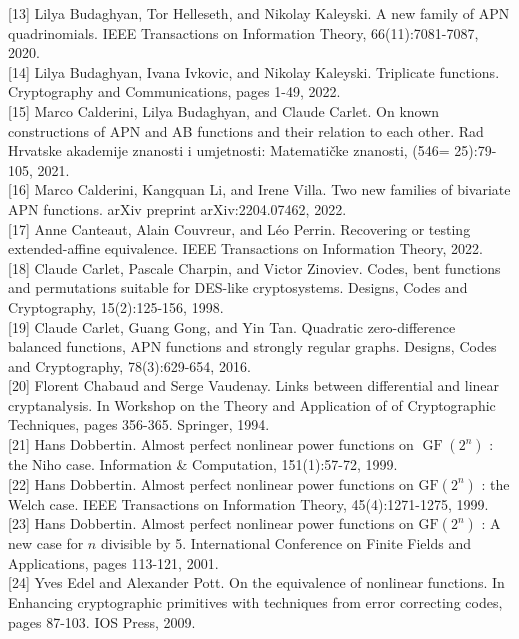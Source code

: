 \documentclass[10pt]{article}
\begin{document}
[13] Lilya Budaghyan, Tor Helleseth, and Nikolay Kaleyski. A new family of APN quadrinomials. IEEE Transactions on Information Theory, 66(11):7081-7087, 2020.\\[0pt]
[14] Lilya Budaghyan, Ivana Ivkovic, and Nikolay Kaleyski. Triplicate functions. Cryptography and Communications, pages 1-49, 2022.\\[0pt]
[15] Marco Calderini, Lilya Budaghyan, and Claude Carlet. On known constructions of APN and AB functions and their relation to each other. Rad Hrvatske akademije znanosti i umjetnosti: Matematičke znanosti, (546= 25):79-105, 2021.\\[0pt]
[16] Marco Calderini, Kangquan Li, and Irene Villa. Two new families of bivariate APN functions. arXiv preprint arXiv:2204.07462, 2022.\\[0pt]
[17] Anne Canteaut, Alain Couvreur, and Léo Perrin. Recovering or testing extended-affine equivalence. IEEE Transactions on Information Theory, 2022.\\[0pt]
[18] Claude Carlet, Pascale Charpin, and Victor Zinoviev. Codes, bent functions and permutations suitable for DES-like cryptosystems. Designs, Codes and Cryptography, 15(2):125-156, 1998.\\[0pt]
[19] Claude Carlet, Guang Gong, and Yin Tan. Quadratic zero-difference balanced functions, APN functions and strongly regular graphs. Designs, Codes and Cryptography, 78(3):629-654, 2016.\\[0pt]
[20] Florent Chabaud and Serge Vaudenay. Links between differential and linear cryptanalysis. In Workshop on the Theory and Application of of Cryptographic Techniques, pages 356-365. Springer, 1994.\\[0pt]
[21] Hans Dobbertin. Almost perfect nonlinear power functions on $\operatorname{GF}\left(2^{n}\right)$ : the Niho case. Information \& Computation, 151(1):57-72, 1999.\\[0pt]
[22] Hans Dobbertin. Almost perfect nonlinear power functions on $\mathrm{GF}\left(2^{n}\right)$ : the Welch case. IEEE Transactions on Information Theory, 45(4):1271-1275, 1999.\\[0pt]
[23] Hans Dobbertin. Almost perfect nonlinear power functions on $\mathrm{GF}\left(2^{n}\right)$ : A new case for $n$ divisible by 5. International Conference on Finite Fields and Applications, pages 113-121, 2001.\\[0pt]
[24] Yves Edel and Alexander Pott. On the equivalence of nonlinear functions. In Enhancing cryptographic primitives with techniques from error correcting codes, pages 87-103. IOS Press, 2009.\\[0pt]
\end{document}
